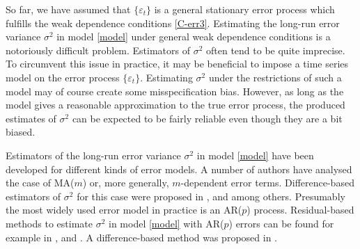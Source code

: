 So far, we have assumed that $\{ \varepsilon_t \}$ is a general stationary error process which fulfills the weak dependence conditions \ref{C-err3}. Estimating the long-run error variance $\sigma^2$ in model \eqref{model} under general weak dependence conditions is a notoriously difficult problem. Estimators of $\sigma^2$ often tend to be quite imprecise. To circumvent this issue in practice, it may be beneficial to impose a time series model on the error process $\{\varepsilon_t\}$. Estimating $\sigma^2$ under the restrictions of such a model may of course create some misspecification bias. However, as long as the model gives a reasonable approximation to the true error process, the produced estimates of $\sigma^2$ can be expected to be fairly reliable even though they are a bit biased. 


Estimators of the long-run error variance $\sigma^2$ in model \eqref{model} have been developed for different kinds of error models. A number of authors have analysed the case of MA($m$) or, more generally, $m$-dependent error terms. Difference-based estimators of $\sigma^2$ for this case were proposed in \cite{MuellerStadtmueller1988}, \cite{Herrmann1992} and \cite{Munk2017} among others. Presumably the most widely used error model in practice is an AR($p$) process. Residual-based methods to estimate $\sigma^2$ in model \eqref{model} with AR($p$) errors can be found for example in \cite{Truong1991}, \cite{ShaoYang2011} and \cite{QiuShaoYang2013}. A difference-based method was proposed in \cite{Hall2003}. 


